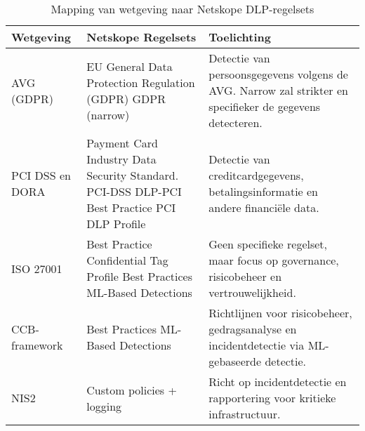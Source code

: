 \begin{table}[h]
    \centering
    \small
    \scriptsize
    \begin{tabular}{p{3cm}p{5cm}p{7cm}}
        \toprule
        \textbf{Wetgeving} & \textbf{Netskope Regelsets} & \textbf{Toelichting} \\
        \midrule
        AVG (GDPR) & 
        EU General Data Protection Regulation (GDPR) \newline 
        GDPR (narrow) & 
        Detectie van persoonsgegevens volgens de AVG. Narrow zal strikter en specifieker de gegevens detecteren. \\
        
        PCI DSS en DORA & 
        Payment Card Industry Data Security Standard. PCI-DSS \newline 
        DLP-PCI \newline 
        Best Practice PCI DLP Profile & 
        Detectie van creditcardgegevens, betalingsinformatie en andere financiële data. \\
        
        ISO 27001 & 
        Best Practice Confidential Tag Profile \newline 
        Best Practices ML-Based Detections & 
        Geen specifieke regelset, maar focus op governance, risicobeheer en vertrouwelijkheid. \\
        
        CCB-framework & 
        Best Practices ML-Based Detections & 
        Richtlijnen voor risicobeheer, gedragsanalyse en incidentdetectie via ML-gebaseerde detectie. \\
        
        NIS2 & 
        Custom policies + logging & 
        Richt op incidentdetectie en rapportering voor kritieke infrastructuur. \\
        \bottomrule
    \end{tabular}
    \caption{Mapping van wetgeving naar Netskope DLP-regelsets}
    \label{tab:Netskope regelsets}
\end{table}


